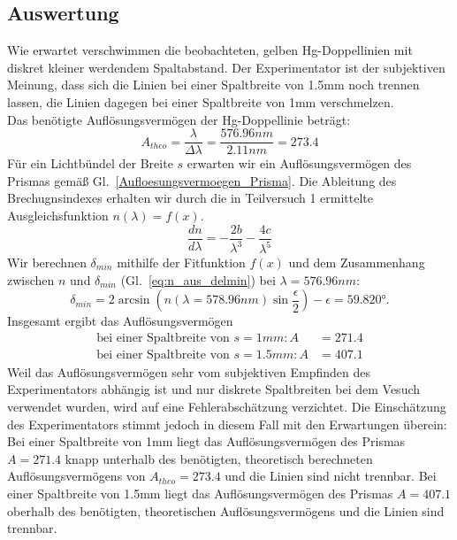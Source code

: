 \documentclass[12pt,a4paper]{article}
\begin{document}
\subsection{Auswertung}
Wie erwartet verschwimmen die beobachteten, gelben Hg-Doppellinien mit diskret kleiner werdendem Spaltabstand. Der Experimentator ist der subjektiven Meinung, dass sich die Linien bei einer Spaltbreite von 1.5mm noch trennen lassen, die Linien dagegen bei einer Spaltbreite von 1mm verschmelzen.\\
Das benötigte Auflösungsvermögen der Hg-Doppellinie beträgt:
\begin{equation}
A_{theo}=\frac{\lambda}{\Delta\lambda}=\frac{576.96nm}{2.11nm}=273.4
\end{equation}
Für ein Lichtbündel der Breite $s$ erwarten wir ein Auflösungsvermögen des Prismas gemäß Gl.~\ref{Aufloesungsvermoegen_Prisma}. Die Ableitung des Brechugnsindexes erhalten wir durch die in Teilversuch 1 ermittelte Ausgleichsfunktion $n(\lambda)=f(x)$. 
\begin{equation}
\frac{dn}{d\lambda}=-\frac{2b}{\lambda^3}-\frac{4c}{\lambda^5}
\end{equation}
Wir berechnen $\delta_{min}$ mithilfe der Fitfunktion $f(x)$ und dem Zusammenhang zwischen $n$ und $\delta_{min}$ (Gl.~\eqref{eq:n_aus_delmin}) bei $\lambda=576.96nm$:
\begin{equation}
\delta_{min}=2\arcsin\left(n(\lambda=578.96nm)\sin{\frac{\epsilon}{2}}\right)-\epsilon=\ang{59.820}.
\end{equation}
Insgesamt ergibt das Auflösungsvermögen
\begin{align}
\text{bei einer Spaltbreite von }s=1mm:A&=271.4\\
\text{bei einer Spaltbreite von }s=1.5mm:A&=407.1
\end{align}
Weil das Auflösungsvermögen sehr vom subjektiven Empfinden des Experimentators abhängig ist und nur diskrete Spaltbreiten bei dem Vesuch verwendet wurden, wird auf eine Fehlerabschätzung verzichtet. Die Einschätzung des Experimentators stimmt jedoch in diesem Fall mit den Erwartungen überein: Bei einer Spaltbreite von 1mm liegt das Auflösungsvermögen des Prismas $A=271.4$ knapp unterhalb des benötigten, theoretisch berechneten Auflösungsvermögens von $A_{theo}=273.4$ und die Linien sind nicht trennbar. Bei einer Spaltbreite von 1.5mm liegt das Auflösungsvermögen des Prismas $A=407.1$ oberhalb des benötigten, theoretischen Auflösungsvermögens und die Linien sind trennbar.
\end{document}
